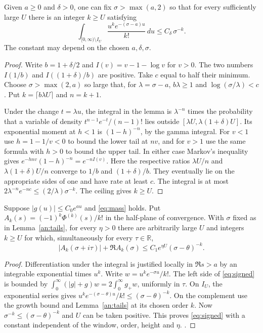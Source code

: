 \begin{lemma}\label{an:tails}
Given \(a\ge0\) and \(\delta>0\), one can fix \(\sigma>\max(a,2)\) so that for every sufficiently large \(U\) there is an integer \(k\ge U\) satisfying
\[
 \int_{[0,\infty)\setminus I_U}\frac{u^k e^{-(\sigma-a)u}}{k!}\,du
 \le C_\delta\,\sigma^{-k}.
\]
The constant may depend on the chosen \(a,\delta,\sigma\).
\end{lemma}
\begin{proof}
Write \(b=1+\delta/2\) and \(I(v)=v-1-\log v\) for \(v>0\). The two numbers \(I(1/b)\) and \(I((1+\delta)/b)\) are positive. Take \(c\) equal to half their minimum. Choose \(\sigma>\max(2,a)\) so large that, for \(\lambda=\sigma-a\), \(b\lambda\ge1\) and \(\log(\sigma/\lambda)<c\). Put \(k=\lceil b\lambda U\rceil\) and \(n=k+1\).

Under the change \(t=\lambda u\), the integral in the lemma is \(\lambda^{-n}\) times the probability that a variable of density \(t^{n-1}e^{-t}/(n-1)!\) lies outside \([\lambda U,\lambda(1+\delta)U]\). Its exponential moment at \(h<1\) is \((1-h)^{-n}\), by the gamma integral. For \(v<1\) use \(h=1-1/v<0\) to bound the lower tail at \(nv\), and for \(v>1\) use the same formula with \(h>0\) to bound the upper tail. In either case Markov's inequality gives \(e^{-hnv}(1-h)^{-n}=e^{-nI(v)}\). Here the respective ratios \(\lambda U/n\) and \(\lambda(1+\delta)U/n\) converge to \(1/b\) and \((1+\delta)/b\). They eventually lie on the appropriate sides of one and have rate at least \(c\). The integral is at most \(2\lambda^{-n}e^{-nc}\le(2/\lambda)\sigma^{-k}\). The ceiling gives \(k\ge U\).
\end{proof}

\begin{lemma}\label{an:signed}
Suppose \(|g(u)|\le C_0 e^{a u}\) and \eqref{eq:mass} holds. Put \(A_k(s)=(-1)^k\Phi^{(k)}(s)/k!\) in the half-plane of convergence. With \(\sigma\) fixed as in Lemma~\ref{an:tails}, for every \(\eta>0\) there are arbitrarily large \(U\) and integers \(k\ge U\) for which, simultaneously for every \(\tau\in\mathbb R\),
\begin{equation}\label{eq:signed}
 |A_k(\sigma+i\tau)|+\Re A_k(\sigma)
 \le C_1 e^{\eta U}(\sigma-\theta)^{-k}.
\end{equation}
\end{lemma}
\begin{proof}
Differentiation under the integral is justified locally in \(\Re s>a\) by an integrable exponential times \(u^k\). Write \(w=u^ke^{-\sigma u}/k!\). The left side of \eqref{eq:signed} is bounded by \(\int_0^\infty(|g|+g)w=2\int_0^\infty g_+w\), uniformly in \(\tau\). On \(I_U\), the exponential series gives \(u^ke^{-(\sigma-\theta)u}/k!\le(\sigma-\theta)^{-k}\). On the complement use the growth bound and Lemma~\ref{an:tails} at its chosen order \(k\). Now \(\sigma^{-k}\le(\sigma-\theta)^{-k}\) and \(U\) can be taken positive. This proves \eqref{eq:signed} with a constant independent of the window, order, height and \(\eta\). .
\end{proof}

